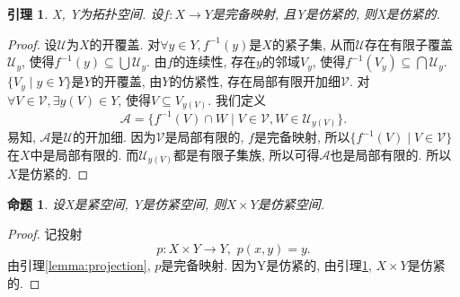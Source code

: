 \documentclass[a4paper,UTF8]{ctexart}
\newtheorem{lemma}[theorem]{引理}
\newtheorem{proposition}[theorem]{命题}
\begin{document}
\begin{lemma} \label{lemma:perfectly paracompact}
  X, Y为拓扑空间. 设$f : X \longrightarrow Y$是完备映射, 且Y是仿紧的,
  则X是仿紧的.
\end{lemma}
\begin{proof}
  设$\mathscr{U}$为$X$的开覆盖. 对$\forall y \in Y, f^{-1}(y)$是$X$的紧子集,
  从而$\mathscr{U}$存在有限子覆盖$\mathscr{U}_y$,
  使得$f^{-1}(y) \subseteq \bigcup \mathscr{U}_y$.
  由$f$的连续性, 存在$y$的邻域$V_y$,
  使得$f^{-1}(V_y) \subseteq \bigcap \mathscr{U}_y$.
  $\{ V_y \mid y \in Y \}$是$Y$的开覆盖, 由$Y$的仿紧性,
  存在局部有限开加细$\mathscr{V}$.
  对$\forall V \in \mathscr{V}, \exists y(V) \in Y$,
  使得$V \subseteq V_{y(V)}$. 我们定义
  \[
    \mathscr{A} = \{ f^{-1}(V) \cap W \mid V \in \mathscr{V}, W \in \mathscr{U}_{y(V)} \}.
  \]
  易知, $\mathscr{A}$是$\mathscr{U}$的开加细.
  因为$\mathscr{V}$是局部有限的, $f$是完备映射,
  所以$\{ f^{-1}(V) \mid V \in \mathscr{V} \}$在$X$中是局部有限的.
  而$\mathscr{U}_{y(V)}$都是有限子集族,
  所以可得$\mathscr{A}$也是局部有限的. 所以$X$是仿紧的.
\end{proof}

\begin{proposition}
  设X是紧空间, Y是仿紧空间, 则$X \times Y$是仿紧空间.
\end{proposition}
\begin{proof}
  记投射
  \[
    p : X \times Y \longrightarrow Y,\,\, p(x, y) = y.
  \]
  由引理\ref{lemma:projection}, $p$是完备映射.
  因为Y是仿紧的, 由引理\ref{lemma:perfectly paracompact},
  $X \times Y$是仿紧的.
\end{proof}
\end{document}
